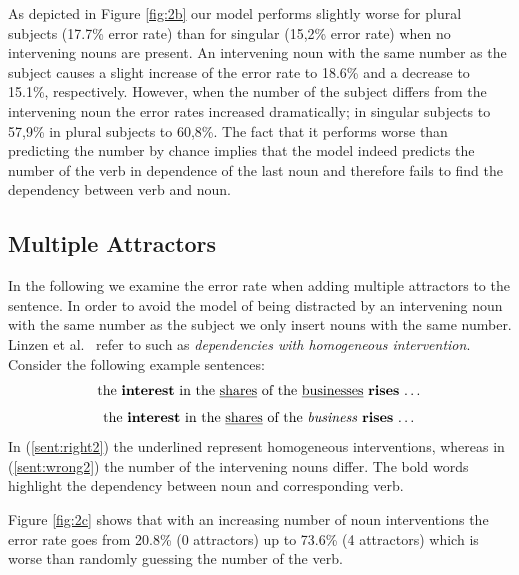 \documentclass[11pt,a4paper]{article}
\begin{document}
As depicted in Figure \ref{fig:2b} our model performs slightly worse for plural subjects (17.7\% error rate) than for singular (15,2\% error rate) when no intervening nouns are present. An intervening noun with the same number as the subject causes a slight increase of the error rate to 18.6\% and a decrease to 15.1\%, respectively. However, when the number of the subject differs from the intervening noun the error rates increased dramatically; in singular subjects to 57,9\% in plural subjects to 60,8\%. The fact that it performs worse than predicting the number by chance implies that the model indeed predicts the number of the verb in dependence of the last noun and therefore fails to find the dependency between verb and noun.

\subsection{Multiple Attractors}

In the following we examine the error rate when adding multiple attractors to the sentence. In order to avoid the model of being distracted by an intervening noun with the same number as the subject we only insert nouns with the same number. Linzen et al.~\citep{Linzen2016} refer to such as  \textit{ dependencies with homogeneous intervention}. Consider the following example sentences:
\begin{equation}
	\label{sent:right2}
	\textnormal{the \textbf{interest} in the \underline{shares} of the \underline{businesses} \textbf{rises} \dots}
\end{equation}
\begin{equation}
	\label{sent:wrong2}
	\textnormal{the \textbf{interest} in the \underline{shares} of the \textit{business} \textbf{rises} \dots}
\end{equation}
In (\ref{sent:right2}) the underlined represent homogeneous interventions, whereas in (\ref{sent:wrong2}) the number of the intervening nouns differ. The bold words highlight the dependency between noun and corresponding verb.

Figure \ref{fig:2c} shows that with an increasing number of noun interventions the error rate goes from 20.8\% (0 attractors) up to 73.6\% (4 attractors) which is worse than randomly guessing the number of the verb. 



\end{document}
